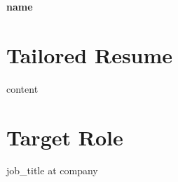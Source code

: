 \documentclass[11pt]{article}
\begin{document}
\begin{center}
{\LARGE \textbf{ {{name}} }}\\
\end{center}
\vspace{0.2in}
\section*{Tailored Resume}
{{content}}
\section*{Target Role}
{{job_title}} at {{company}}
\end{document}
